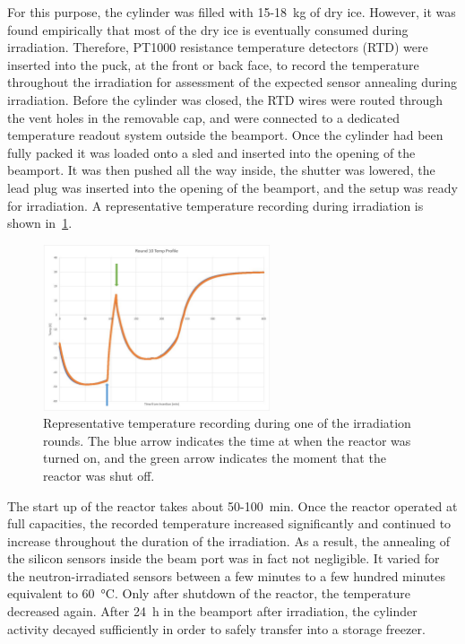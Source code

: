 For this purpose, the cylinder was filled with 15-\SI{18}{\kilo\gram} of dry ice.
However, it was found empirically that most of the dry ice is eventually consumed during irradiation.
Therefore, PT1000 resistance temperature detectors (RTD) were inserted into the puck, at the front or back face, to record the temperature throughout the irradiation for assessment of the expected sensor annealing during irradiation.
Before the cylinder was closed, the RTD wires were routed through the vent holes in the removable cap, and were connected to a dedicated temperature readout system outside the beamport.\newline 
Once the cylinder had been fully packed it was loaded onto a sled and inserted into the opening of the beamport.
It was then pushed all the way inside, the shutter was lowered, the lead plug was inserted into the opening of the beamport, and the setup was ready for irradiation.\newline
A representative temperature recording during irradiation is shown in~\ref{fig:Round_10_Temperature_Profile}.
\begin{figure}[!hbt]
  \begin{center}
    \includegraphics[width=0.60\textwidth]{figures/Round_10_Temperature_Profile}
    \caption{Representative temperature recording during one of the irradiation rounds. 
    The blue arrow indicates the time at when the reactor was turned on, and the green arrow indicates the moment that the reactor was shut off.}
    \label{fig:Round_10_Temperature_Profile}
  \end{center}
\end{figure}
The start up of the reactor takes about 50-\SI{100}{\minute}. 
Once the reactor operated at full capacities, the recorded temperature increased significantly and continued to increase throughout the duration of the irradiation.
As a result, the annealing of the silicon sensors inside the beam port was in fact not negligible.
It varied for the neutron-irradiated sensors between a few minutes to a few hundred minutes equivalent to \SI{60}{\celsius}.
Only after shutdown of the reactor, the temperature decreased again.
After \SI{24}{\hour} in the beamport after irradiation, the cylinder activity decayed sufficiently in order to safely transfer into a storage freezer.

